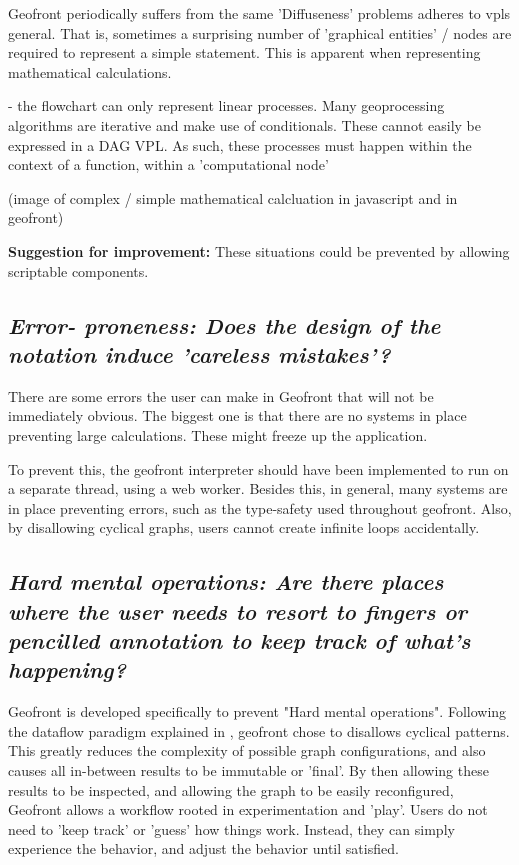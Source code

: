 Geofront periodically suffers from the same 'Diffuseness' problems \cite[]{green_usability_1996} adheres to vpls general. 
That is, sometimes a surprising number of 'graphical entities' / nodes are required to represent a simple statement.  
This is apparent when representing mathematical calculations. 

\begin{note}
  - the flowchart can only represent linear processes. Many geoprocessing algorithms are iterative and make use of conditionals. These cannot easily be expressed in a DAG VPL. As such, these processes must happen within the context of a function, within a 'computational node'  
\end{note}


(image of complex / simple mathematical calcluation in javascript and in geofront)

\textbf{Suggestion for improvement:} These situations could be prevented by allowing scriptable components. 

\subsection*{\emph{Error- proneness: Does the design of the notation induce 'careless mistakes'? }}

There are some errors the user can make  in Geofront that will not be immediately obvious. 
The biggest one is that there are no systems in place preventing large calculations. 
These might freeze up the application. 

To prevent this, the geofront interpreter should have been implemented to run on a separate thread, using a web worker. 
Besides this, in general, many systems are in place preventing errors, such as the type-safety used throughout geofront.
Also, by disallowing cyclical graphs, users cannot create infinite loops accidentally.

\subsection*{\emph{Hard mental operations: Are there places where the user needs to resort to fingers or pencilled annotation to keep track of what's happening? }}

Geofront is developed specifically to prevent "Hard mental operations".
Following the dataflow paradigm explained in , geofront chose to disallows cyclical patterns. 
This greatly reduces the complexity of possible graph configurations, and also causes all in-between results to be immutable or 'final'.
By then allowing these results to be inspected, and allowing the graph to be easily reconfigured, Geofront allows a workflow rooted in experimentation and 'play'.
Users do not need to 'keep track' or 'guess' how things work.
Instead, they can simply experience the behavior, and adjust the behavior until satisfied. 



